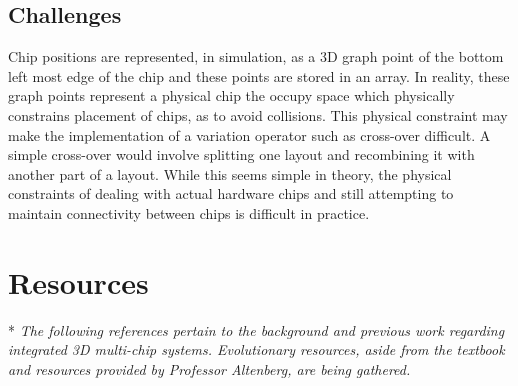 \subsection{Challenges}

Chip positions are represented, in simulation, as a 3D graph point of the bottom
left most edge of the chip and these points are stored in an array.  In reality,
these graph points represent a physical chip the occupy space which physically
constrains placement of chips, as to avoid collisions. This physical constraint
may make the implementation of a variation operator such as cross-over difficult.
A simple cross-over would involve splitting one layout and recombining it with
another part of a layout.  While this seems simple in theory, the physical
constraints of dealing with actual hardware chips and still attempting to
maintain connectivity between chips is difficult in practice.   

\section{Resources}

* \emph{The following references pertain to the background and previous work regarding
integrated 3D multi-chip systems.  Evolutionary resources, aside from the textbook and resources provided by Professor Altenberg, are being gathered.}

\nocite{*}








